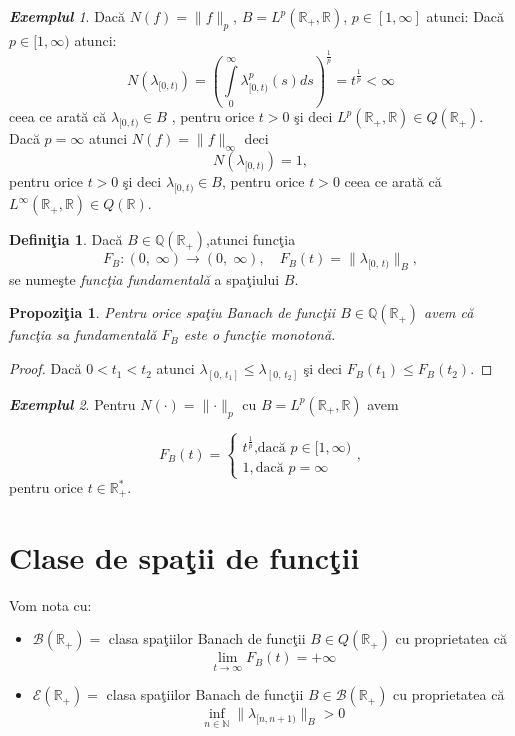 \documentclass[ a4paper, 12pt]{report}
\newtheorem{prop}[theorem]{\bf Propozi\c tia }
\theoremstyle{definition}
\newtheorem{definition}{\bf Defini\c tia}[section]
\theoremstyle{remark}
\newtheorem{exemple}{\bf Exemplul}[section]
\numberwithin{equation}{section}
\begin{document}
\begin{exemple}
Dac\u a $N(f) = \lVert f \rVert_p$, $B = L^p(\mathbb{R}_+ , \mathbb{R})$, $p \in [1,\infty]$ atunci:
\smallskip
Dac\u a $ p \in [1,\infty)$ atunci:
$$N(\lambda_{[0,t)}) = (\int\limits_{0}^{\infty} \lambda_{[0,t)}^p (s)  ds)^ \frac{1}{p} = t^\frac{1}{p}<\infty$$ ceea ce arat\u a c\u a  $\lambda_{[0,t)}\in B$ , pentru orice $t>0$ \c si deci $L^p (\mathbb{R}_+,\mathbb{R}) \in Q(\mathbb{R}_+)$.
\smallskip
Dac\u a $p = \infty $ atunci $N(f) = \lVert f \rVert_{\infty}$ deci
$$N(\lambda_{[0,t)}) = 1,$$ pentru orice $t> 0$ \c si deci $\lambda_{[0,t)} \in B$, pentru orice $t>0$ ceea ce arat\u a c\u a $L^{\infty}(\mathbb{R}_+ , \mathbb{R}) \in Q(\mathbb{R})$.
\end{exemple}

\begin{definition}
Dac\u a $B\in \mathbb{Q}(\mathbb{R}_+)$,atunci func\c tia
$$F_B : (0,\; \infty) \rightarrow (0,\; \infty), \quad F_B(t) = \lVert \lambda_ {[0,\, t)} \rVert_B,$$ se nume\c ste {\it func\c tia fundamental\u a} a spa\c tiului $B$.
\end{definition}

\begin{prop}
Pentru orice spa\c tiu Banach de func\c tii $B\in \mathbb{Q}(\mathbb{R}_+)$ avem c\u a func\c tia sa fundamental\u a $F_B$ este o func\c tie monoton\u a.
\end{prop}

\begin{proof}
Dac\u a $0< t_1 < t_2$ atunci $\lambda_{[0,\, t_1]} \leqslant \lambda_{[0,\, t_2]}$ \c si deci $F_B{(t_1)}\leqslant F_B{(t_2)}$.
\end{proof}

\begin{exemple}
Pentru $N(\cdot) = \lVert \cdot \rVert_p$ cu $B = L^p(\mathbb{R}_+ , \mathbb{R})$ avem

$$F_B{(t)}= \begin{cases}
t^{\frac{1}{p}} \text{,dac\u a $p \in [1,\infty)$} \\
1 ,\text{dac\u a $p = \infty$}
\end{cases}, $$ pentru orice $t \in \mathbb{R}_+^{*}$.
\end{exemple}


\section{Clase de spa\c tii de func\c tii}

Vom nota cu:
\begin{itemize}
\item $\mathcal{B}(\mathbb{R}_+) =$ clasa spa\c tiilor Banach de func\c tii $B \in Q(\mathbb{R}_+)$ cu proprietatea c\u a
\[ \lim_{t \to \infty} F_B{(t)} = +\infty \]
\item $\mathcal{E}(\mathbb{R}_+) = $ clasa spa\c tiilor Banach de func\c tii $B \in \mathcal{B}(\mathbb{R}_+)$ cu proprietatea c\u a \[ \inf_{n \in \mathbb{N}} \lVert \lambda_{[n,n+1)} \rVert_B >0\]
\end{itemize}
\end{document}
